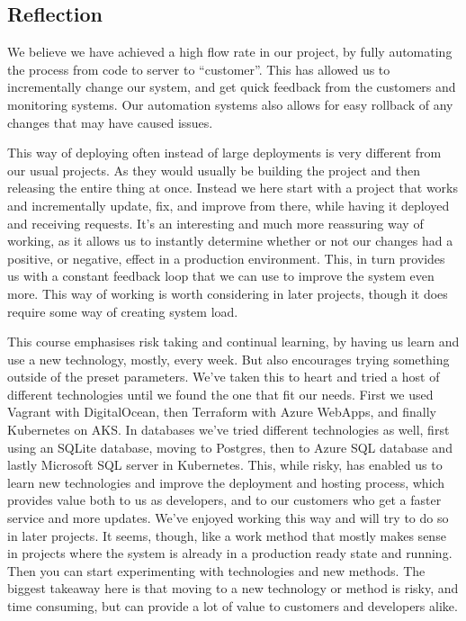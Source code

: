 \subsection{Reflection}
We believe we have achieved a high flow rate in our project, by fully automating the process from code to server to ``customer''.
This has allowed us to incrementally change our system, and get quick feedback from the customers and monitoring systems.
Our automation systems also allows for easy rollback of any changes that may have caused issues.

This way of deploying often instead of large deployments is very different from our usual projects. As they would usually be building the project and then releasing the entire thing at once.
Instead we here start with a project that works and incrementally update, fix, and improve from there, while having it deployed and receiving requests.
It's an interesting and much more reassuring way of working, as it allows us to instantly determine whether or not our changes had a positive, or negative, effect in a production environment.
This, in turn provides us with a constant feedback loop that we can use to improve the system even more.
This way of working is worth considering in later projects, though it does require some way of creating system load.

This course emphasises risk taking and continual learning, by having us learn and use a new technology, mostly, every week.
But also encourages trying something outside of the preset parameters.
We've taken this to heart and tried a host of different technologies until we found the one that fit our needs. First we used Vagrant with DigitalOcean, then Terraform with Azure WebApps, and finally Kubernetes on AKS.
In databases we've tried different technologies as well, first using an SQLite database, moving to Postgres, then to Azure SQL database and lastly Microsoft SQL server in Kubernetes.
This, while risky, has enabled us to learn new technologies and improve the deployment and hosting process, which provides value both to us as developers, and to our customers who get a faster service and more updates.
We've enjoyed working this way and will try to do so in later projects.
It seems, though, like a work method that mostly makes sense in projects where the system is already in a production ready state and running.
Then you can start experimenting with technologies and new methods.
The biggest takeaway here is that moving to a new technology or method is risky, and time consuming, but can provide a lot of value to customers and developers alike.

